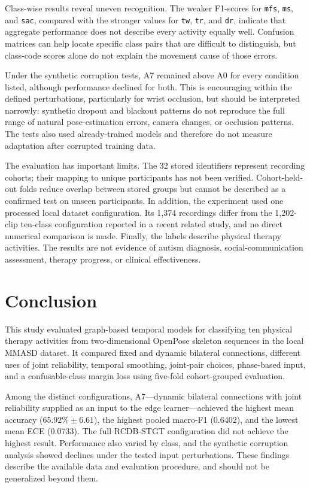 Class-wise results reveal uneven recognition. The weaker F1-scores for \texttt{mfs}, \texttt{ms}, and \texttt{sac}, compared with the stronger values for \texttt{tw}, \texttt{tr}, and \texttt{dr}, indicate that aggregate performance does not describe every activity equally well. Confusion matrices can help locate specific class pairs that are difficult to distinguish, but class-code scores alone do not explain the movement cause of those errors.

Under the synthetic corruption tests, A7 remained above A0 for every condition listed, although performance declined for both. This is encouraging within the defined perturbations, particularly for wrist occlusion, but should be interpreted narrowly: synthetic dropout and blackout patterns do not reproduce the full range of natural pose-estimation errors, camera changes, or occlusion patterns. The tests also used already-trained models and therefore do not measure adaptation after corrupted training data.

The evaluation has important limits. The 32 stored identifiers represent recording cohorts; their mapping to unique participants has not been verified. Cohort-held-out folds reduce overlap between stored groups but cannot be described as a confirmed test on unseen participants. In addition, the experiment used one processed local dataset configuration. Its 1,374 recordings differ from the 1,202-clip ten-class configuration reported in a recent related study, and no direct numerical comparison is made. Finally, the labels describe physical therapy activities. The results are not evidence of autism diagnosis, social-communication assessment, therapy progress, or clinical effectiveness.

\section{Conclusion}\label{sec:conclusion}

This study evaluated graph-based temporal models for classifying ten physical therapy activities from two-dimensional OpenPose skeleton sequences in the local MMASD dataset. It compared fixed and dynamic bilateral connections, different uses of joint reliability, temporal smoothing, joint-pair choices, phase-based input, and a confusable-class margin loss using five-fold cohort-grouped evaluation.

Among the distinct configurations, A7—dynamic bilateral connections with joint reliability supplied as an input to the edge learner—achieved the highest mean accuracy ($65.92\% \pm 6.61$), the highest pooled macro-F1 (0.6402), and the lowest mean ECE (0.0733). The full RCDB-STGT configuration did not achieve the highest result. Performance also varied by class, and the synthetic corruption analysis showed declines under the tested input perturbations. These findings describe the available data and evaluation procedure, and should not be generalized beyond them.

